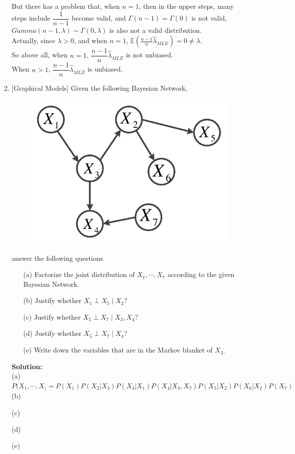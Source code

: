 \documentclass[10pt]{article}
\begin{document}
\begin{enumerate}[1.]
		  But there has a problem that, when $n=1$, then in the upper steps, many steps include $\dfrac{1}{n-1}$ become valid, and 
		  $\Gamma(n-1)=\Gamma(0)$ is not valid, $Gamma(n-1,\lambda)\sim\Gamma(0,\lambda)$ is also not a valid distribution.\\
		  Actually, since $\lambda>0$, and when $n=1$, $\mathbb{E}(\frac{n-1}{n}\hat{\lambda}_{MLE})=0\neq\lambda$.\\
		  
		  So above all, when $n=1$, $\dfrac{n-1}{n}\hat{\lambda}_{MLE}$ is not unbiased.\\
		  When $n>1$, $\dfrac{n-1}{n}\hat{\lambda}_{MLE}$ is unbiased.\\

      	  \newpage

	\item {} [Graphical Models]
	Given the following Bayesian Network, 
	\begin{figure}[h]
		\label{fig:bn}
		\vskip 0.2in
		\begin{center}
		\centerline{\includegraphics[width=0.4\columnwidth]{figures/bn}}
		\end{center}
		\vskip -0.2in
	\end{figure}

	answer the following questions.
		\begin{itemize}
			\item[(a)] Factorize the joint distribution of $X_{1},\cdots,X_{7}$ according 
			to the given Bayesian Network.~ 
			\item[(b)] Justify whether $X_{1}\perp X_{5}\mid X_{2}$?~ 
			\item[(c)] Justify whether $X_{5}\perp X_{7}\mid X_{3},X_{4}$?~ 
			\item[(d)] Justify whether $X_{5}\perp X_{7}\mid X_{4}$?~ 
			\item[(e)] Write down the variables that are in the Markov blanket of $X_{3}$.~ 
		\end{itemize}

		\textbf{Solution:}\\
		(a) $P(X_1,\cdots,X_)=P(X_1)P(X_2|X_3)P(X_3|X_1)P(X_4|X_3,X_7)P(X_5|X_2)P(X_6|X_2)P(X_7)$\\

		(b)




		(c)



		(d)




		(e)

		



\end{enumerate}
\end{document}
